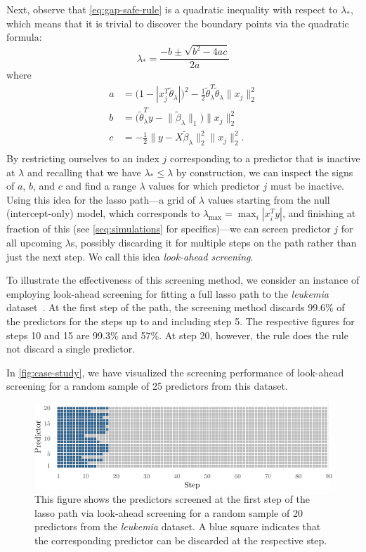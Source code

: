 \documentclass[b5paper,10pt,abstractoff,DIV=calc,headings=normal,twoside]{scrartcl}
\theoremstyle{plain}
\theoremstyle{definition}
\theoremstyle{remark}
\begin{document}
Next, observe that \eqref{eq:gap-safe-rule} is a quadratic inequality with
respect to \(\lambda_*\), which
means that it is trivial to discover the boundary points via the
quadratic formula:
\[
  \lambda_* = \frac{-b \pm \sqrt{b^2 - 4ac}}{2a}
\]
where
\[
  \begin{aligned}
    a & = \big( 1 - | x_j^T \tilde\theta_\lambda|\big)^2 -
    \frac 12 \tilde\theta_\lambda^T \tilde\theta_\lambda \lVert x_j\rVert_2^2      \\
    b & = \big(\tilde\theta_\lambda^T y - \lVert \tilde\beta_\lambda \rVert_1\big)
    \lVert x_j \rVert_2^2                                                          \\
    c & = - \frac 12 \lVert y - X\tilde\beta_\lambda\rVert_2^2
    \lVert x_j\rVert_2^2.                                                          \\
  \end{aligned}
\]
By restricting ourselves to an index \(j\) corresponding to a predictor that is
inactive at \(\lambda\) and recalling that we have \(\lambda_* \leq \lambda\) by
construction, we can inspect the signs of \(a\), \(b\), and \(c\) and find a
range \(\lambda\) values for which predictor \(j\) must be inactive. Using this
idea for the lasso path---a grid of \(\lambda\) values starting from the null
(intercept-only) model, which corresponds to \(\lambda_\text{max} =
\max_i|x_i^Ty|\), and finishing at fraction of this (see
\autoref{seq:simulations} for specifics)---we can screen predictor \(j\) for all
upcoming \(\lambda\)s, possibly discarding it for multiple steps on the path
rather than just the next step. We call this idea \emph{look-ahead screening}.

To illustrate the effectiveness of this screening method,
we consider an instance of employing look-ahead screening for fitting
a full lasso path to the \emph{leukemia} dataset~\citep{golub1999}.
At the first step of
the path, the screening method discards 99.6\% of the
predictors for the steps up to and including
step 5. The respective figures for steps 10 and 15 are 99.3\% and 57\%.
At step 20, however, the
rule does the rule not discard a single predictor.

In \autoref{fig:case-study}, we have visualized the screening performance
of look-ahead screening for a random sample of 25 predictors from this
dataset.

\begin{figure}[hbtp]
  \centering
  \includegraphics{figures/casestudy.pdf}
  \caption{This figure shows the predictors screened at the first step of the
    lasso path via look-ahead screening for a random sample of
    20 predictors from the \emph{leukemia}
    dataset. A blue square indicates that the corresponding predictor can
    be discarded at the respective step.\label{fig:case-study}}
\end{figure}
\end{document}
